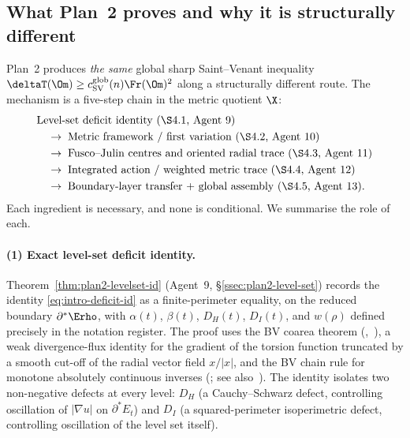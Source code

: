 \subsection{What Plan~2 proves and why it is structurally different}
\label{ssec:intro-plan2}

Plan~2 produces \emph{the same} global sharp Saint--Venant inequality
$\deltaT(\Om)\ge c_{\rm SV}^{\rm glob}(n)\Fr(\Om)^2$ along a
structurally different route. The mechanism is a five-step chain in
the metric quotient $\X$:
\[
   \begin{aligned}
      &\text{Level-set deficit identity (\S4.1, Agent~9)}\\
      &\quad\to\;\text{Metric framework / first variation (\S4.2, Agent~10)}\\
      &\quad\to\;\text{Fusco--Julin centres and oriented radial trace (\S4.3, Agent~11)}\\
      &\quad\to\;\text{Integrated action / weighted metric trace (\S4.4, Agent~12)}\\
      &\quad\to\;\text{Boundary-layer transfer + global assembly (\S4.5, Agent~13).}
   \end{aligned}
\]
Each ingredient is necessary, and none is conditional. We summarise
the role of each.

\paragraph{(1) Exact level-set deficit identity.}
Theorem~\ref{thm:plan2-levelset-id} (Agent~9, \S\ref{ssec:plan2-level-set})
records the identity
\eqref{eq:intro-deficit-id} as a finite-perimeter equality, on the
reduced boundary $\partial^*\Erho$, with $\alpha(t)$, $\beta(t)$,
$D_H(t)$, $D_I(t)$, and $w(\rho)$ defined precisely in the notation
register. The proof uses the BV coarea theorem
(\cite[Thm~13.1]{Maggi2012},~\cite[Thm~3.40]{AFP2000}), a weak
divergence-flux identity for the gradient of the torsion function
truncated by a smooth cut-off of the radial vector field $x/|x|$, and
the BV chain rule for monotone absolutely continuous inverses
(\cite[Thm~0.4]{BBC1975}; see also~\cite[Thm~3.99]{AFP2000}). The
identity isolates two non-negative defects at every level: $D_H$ (a
Cauchy--Schwarz defect, controlling oscillation of $|\nabla u|$ on
$\partial^*E_t$) and $D_I$ (a squared-perimeter isoperimetric defect,
controlling oscillation of the level set itself).

